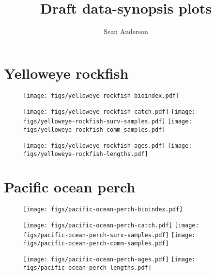 \documentclass[12pt]{article}
\title{Draft data-synopsis plots}
\author{Sean Anderson}
\begin{document}







% 

\section{Yelloweye rockfish}

\begin{figure}[h]
  \parbox{\textwidth}{
    \parbox{2.5in}{%
         \texttt{[image: figs/yelloweye-rockfish-bioindex.pdf]}
    }
    \parbox{3in}{%
       \texttt{[image: figs/yelloweye-rockfish-catch.pdf]}
       \texttt{[image: figs/yelloweye-rockfish-surv-samples.pdf]}
       \texttt{[image: figs/yelloweye-rockfish-comm-samples.pdf]}
    }}
    \texttt{[image: figs/yelloweye-rockfish-ages.pdf]}
    \texttt{[image: figs/yelloweye-rockfish-lengths.pdf]}
\end{figure}

\clearpage

\section{Pacific ocean perch}

\begin{figure}[h]
  \parbox{\textwidth}{
    \parbox{2.5in}{%
         \texttt{[image: figs/pacific-ocean-perch-bioindex.pdf]}
    }
    \parbox{3in}{%
       \texttt{[image: figs/pacific-ocean-perch-catch.pdf]}
       \texttt{[image: figs/pacific-ocean-perch-surv-samples.pdf]}
       \texttt{[image: figs/pacific-ocean-perch-comm-samples.pdf]}
    }}
    \texttt{[image: figs/pacific-ocean-perch-ages.pdf]}
    \texttt{[image: figs/pacific-ocean-perch-lengths.pdf]}
\end{figure}
\end{document}
